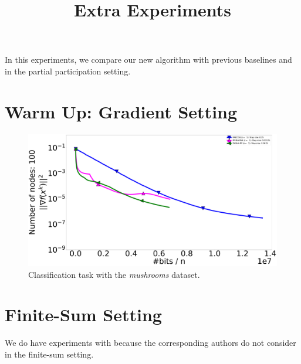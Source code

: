 \documentclass{article}
\title{Extra Experiments}
\begin{document}
\maketitle

In this experiments, we compare our new algorithm  with previous baselines  and  in the partial participation setting.
\section*{Warm Up: Gradient Setting}
\begin{figure}[h]
\includegraphics[width=\textwidth]{neurips_2022_gradient_mushrooms_nodes_100_coord_10_prob_0_01_seeds_3_no_init_with_pp_marina.pdf}
\caption{Classification task with the \textit{mushrooms} dataset.}
\label{fig:gradient}
\end{figure}
\section*{Finite-Sum Setting}
We do have experiments with  because the corresponding authors do not consider  in the finite-sum setting.
\end{document}
